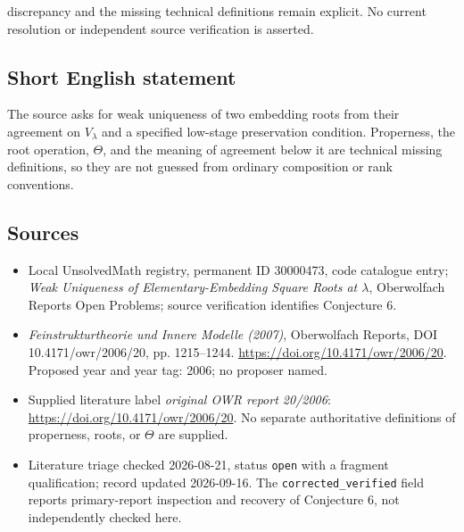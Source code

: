 \documentclass[11pt]{article}
\begin{document}
discrepancy and the missing technical definitions remain explicit. No current resolution or independent source verification is asserted.
\subsection{Short English statement}
The source asks for weak uniqueness of two embedding roots from their agreement on \(V_\lambda\) and a specified low-stage preservation condition. Properness, the root operation, \(\Theta\), and the meaning of agreement below it are technical missing definitions, so they are not guessed from ordinary composition or rank conventions.
\subsection{Sources}
\begin{itemize}\item Local UnsolvedMath registry, permanent ID 30000473, code catalogue entry; \emph{Weak Uniqueness of Elementary-Embedding Square Roots at \(\lambda\)}, Oberwolfach Reports Open Problems; source verification identifies Conjecture 6.\item \emph{Feinstrukturtheorie und Innere Modelle (2007)}, Oberwolfach Reports, DOI 10.4171/owr/2006/20, pp. 1215--1244. \url{https://doi.org/10.4171/owr/2006/20}. Proposed year and year tag: 2006; no proposer named.\item Supplied literature label \emph{original OWR report 20/2006}: \url{https://doi.org/10.4171/owr/2006/20}. No separate authoritative definitions of properness, roots, or \(\Theta\) are supplied.\item Literature triage checked 2026-08-21, status \texttt{open} with a fragment qualification; record updated 2026-09-16. The \texttt{corrected\_verified} field reports primary-report inspection and recovery of Conjecture 6, not independently checked here.\end{itemize}
\end{document}
